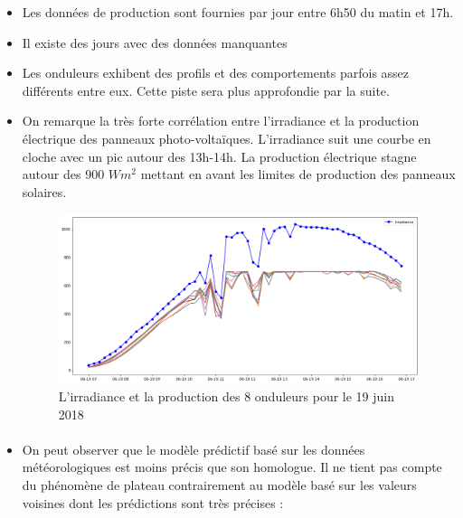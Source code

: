 \begin{itemize}
\item Les données de production sont fournies par jour entre 6h50 du matin et 17h.
\item Il existe des jours avec des données manquantes
\item Les onduleurs exhibent des profils et des comportements parfois assez différents entre eux. Cette piste sera plus approfondie par la suite.
\item On remarque la très forte corrélation entre l'irradiance et la production électrique des panneaux photo-voltaïques. L'irradiance suit une courbe en cloche avec un pic autour des 13h-14h. La production électrique stagne autour des 900 $Wm^2$ mettant en avant les limites de production des panneaux solaires. 


\begin{figure}[!ht]
\begin{center}
\includegraphics[scale=0.3]{rapport/images/Ch6_Irradiance-Prod.png}
\end{center}
\caption{L'irradiance et la production des 8 onduleurs pour le 19 juin 2018}
\end{figure}
\FloatBarrier
\paragraph{}
\item On peut observer que le modèle prédictif basé sur les données météorologiques est moins précis que son homologue. Il ne tient pas compte du phénomène de plateau contrairement au modèle basé sur les valeurs voisines dont les prédictions sont très précises :


\end{itemize}
